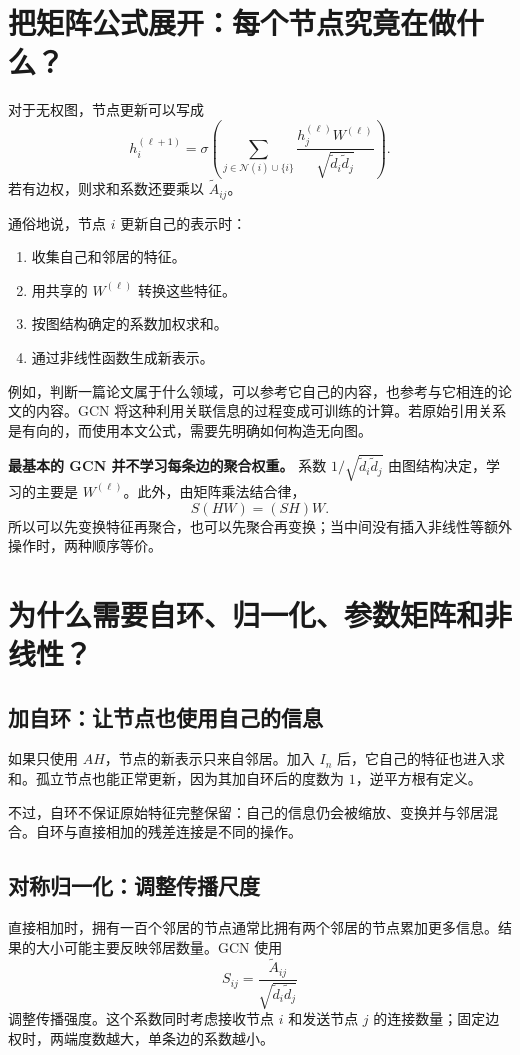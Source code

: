 \documentclass[UTF8,a4paper,11pt,fontset=fandol]{ctexart}
\begin{document}
\section{把矩阵公式展开：每个节点究竟在做什么？}
对于无权图，节点更新可以写成
\begin{equation}
\boxed{
h_i^{(\ell+1)}=\sigma\!\left(
\sum_{j\in\mathcal N(i)\cup\{i\}}
\frac{h_j^{(\ell)}W^{(\ell)}}{\sqrt{\widetilde d_i\widetilde d_j}}
\right).
}
\label{eq:node}
\end{equation}
若有边权，则求和系数还要乘以 $\widetilde A_{ij}$。

通俗地说，节点 $i$ 更新自己的表示时：
\begin{enumerate}
\item 收集自己和邻居的特征。
\item 用共享的 $W^{(\ell)}$ 转换这些特征。
\item 按图结构确定的系数加权求和。
\item 通过非线性函数生成新表示。
\end{enumerate}
例如，判断一篇论文属于什么领域，可以参考它自己的内容，也参考与它相连的论文的内容。GCN 将这种利用关联信息的过程变成可训练的计算。若原始引用关系是有向的，而使用本文公式，需要先明确如何构造无向图。

\textbf{最基本的 GCN 并不学习每条边的聚合权重。} 系数 $1/\sqrt{\widetilde d_i\widetilde d_j}$ 由图结构决定，学习的主要是 $W^{(\ell)}$。此外，由矩阵乘法结合律，
\begin{equation}
S(HW)=(SH)W.
\end{equation}
所以可以先变换特征再聚合，也可以先聚合再变换；当中间没有插入非线性等额外操作时，两种顺序等价。

\section{为什么需要自环、归一化、参数矩阵和非线性？}
\subsection{加自环：让节点也使用自己的信息}
如果只使用 $AH$，节点的新表示只来自邻居。加入 $I_n$ 后，它自己的特征也进入求和。孤立节点也能正常更新，因为其加自环后的度数为 $1$，逆平方根有定义。

不过，自环不保证原始特征完整保留：自己的信息仍会被缩放、变换并与邻居混合。自环与直接相加的残差连接是不同的操作。

\subsection{对称归一化：调整传播尺度}
直接相加时，拥有一百个邻居的节点通常比拥有两个邻居的节点累加更多信息。结果的大小可能主要反映邻居数量。GCN 使用
\begin{equation}
S_{ij}=\frac{\widetilde A_{ij}}{\sqrt{\widetilde d_i\widetilde d_j}}
\end{equation}
调整传播强度。这个系数同时考虑接收节点 $i$ 和发送节点 $j$ 的连接数量；固定边权时，两端度数越大，单条边的系数越小。
\end{document}
